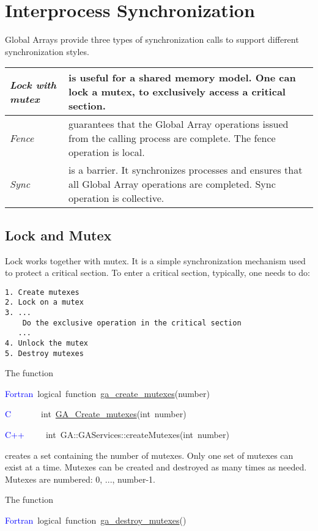 \chapter{Interprocess Synchronization}

Global Arrays provide three types of synchronization calls to support
different synchronization styles. 

\begin{tabular}{|>{\centering}p{3cm}|>{\raggedright}p{6cm}|}
\hline 
\emph{Lock with mutex}  & is useful for a shared memory model. One can lock a mutex, to exclusively
access a critical section. \tabularnewline
\hline 
\emph{Fence}  & guarantees that the Global Array operations issued from the calling
process are complete. The fence operation is local. \tabularnewline
\hline 
\emph{Sync}  & is a barrier. It synchronizes processes and ensures that all Global
Array operations are completed. Sync operation is collective. \tabularnewline
\hline
\end{tabular}


\section{Lock and Mutex }

Lock works together with mutex. It is a simple synchronization mechanism
used to protect a critical section. To enter a critical section, typically,
one needs to do:
\begin{verbatim}
1. Create mutexes
2. Lock on a mutex
3. ...
    Do the exclusive operation in the critical section
   ...
4. Unlock the mutex
5. Destroy mutexes
\end{verbatim}
The function

\textcolor{blue}{Fortran}~logical~function~\href{https://hpc.pnl.gov/globalarrays/api/f_op_api.html#CREATE_MUTEXES}{ga\_{}create\_{}mutexes}(number)~

\textcolor{blue}{C}~~~~~~~int~\href{https://hpc.pnl.gov/globalarrays/api/c_op_api.html#CREATE_MUTEXES}{GA\_{}Create\_{}mutexes}(int~number)~

\textcolor{blue}{C++~}~~~~int~GA::GAServices::createMutexes(int~number)

creates a set containing the number of mutexes. Only one set of mutexes
can exist at a time. Mutexes can be created and destroyed as many
times as needed. Mutexes are numbered: 0, ..., number-1.

The function

\textcolor{blue}{Fortran}~logical~function~\href{https://hpc.pnl.gov/globalarrays/api/f_op_api.html#DESTROY_MUTEXES}{ga\_{}destroy\_{}mutexes}()~

